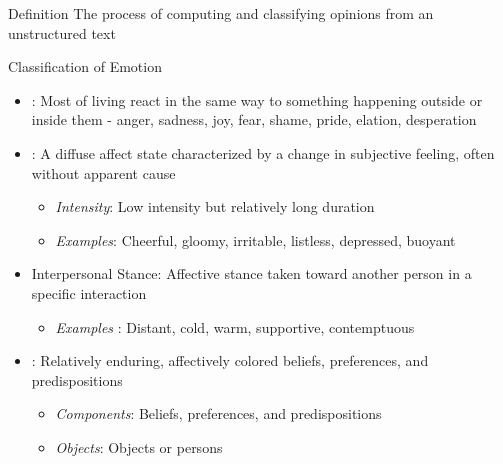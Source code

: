 

\begin{frame}{Definition}
\Huge
The process of computing and classifying opinions from an unstructured text

\end{frame}

\begin{frame}{Classification of Emotion}
\begin{itemize}
    \item {}: Most of living  react in the same way to something happening outside or inside them -  anger, sadness, joy, fear, shame,
    pride, elation, desperation
    \item {}: A diffuse affect state characterized by a change in subjective feeling, often without apparent cause
    \begin{itemize}
        \item \textit{ Intensity}: Low intensity but relatively long duration
        \item  \textit{Examples}: Cheerful, gloomy, irritable, listless, depressed, buoyant
    \end{itemize}
    \item {Interpersonal Stance}: Affective stance taken toward another person in a specific interaction
    \begin{itemize}
        \item \textit{Examples} : Distant, cold, warm, supportive, contemptuous
    \end{itemize}
    \item 	{}: Relatively enduring, affectively colored beliefs, preferences, and predispositions
    \begin{itemize}
        \item  \textit{Components}: Beliefs, preferences, and predispositions
        \item \textit{Objects}: Objects or persons
    \end{itemize}
\end{itemize}
\end{frame}

